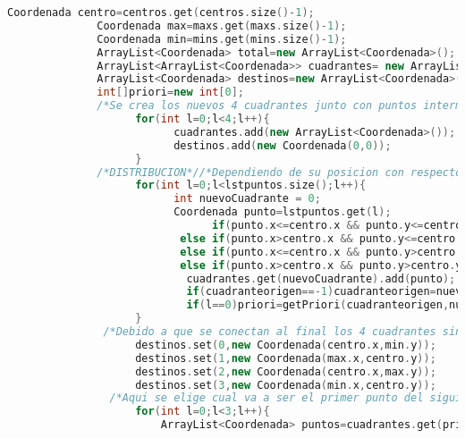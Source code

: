 \begin{lstlisting}[language=C++, caption=Algoritmo Base del Método de Cuadrantes, label=lst:codigo11,escapechar=|]
              Coordenada centro=centros.get(centros.size()-1);
              Coordenada max=maxs.get(maxs.size()-1);
              Coordenada min=mins.get(mins.size()-1);
              ArrayList<Coordenada> total=new ArrayList<Coordenada>(); //Resultado final
              ArrayList<ArrayList<Coordenada>> cuadrantes= new ArrayList<ArrayList<Coordenada>>();
              ArrayList<Coordenada> destinos=new ArrayList<Coordenada>(4);
              int[]priori=new int[0];
              /*Se crea los nuevos 4 cuadrantes junto con puntos intermedios para conectar cuadrante-cuadrante*/
                    for(int l=0;l<4;l++){
                          cuadrantes.add(new ArrayList<Coordenada>());
                          destinos.add(new Coordenada(0,0));
                    }
              /*DISTRIBUCION*//*Dependiendo de su posicion con respecto a los ejes del centro se iran a un determinado cuadrante*/
                    for(int l=0;l<lstpuntos.size();l++){
                          int nuevoCuadrante = 0;
                          Coordenada punto=lstpuntos.get(l);
                                if(punto.x<=centro.x && punto.y<=centro.y){nuevoCuadrante = 0;}
                           else if(punto.x>centro.x && punto.y<=centro.y){nuevoCuadrante = 1;}
                           else if(punto.x<=centro.x && punto.y>centro.y){nuevoCuadrante = 3;}
                           else if(punto.x>centro.x && punto.y>centro.y){nuevoCuadrante = 2;} 
                            cuadrantes.get(nuevoCuadrante).add(punto);
                            if(cuadranteorigen==-1)cuadranteorigen=nuevoCuadrante;
                            if(l==0)priori=getPriori(cuadranteorigen,nuevoCuadrante,cuadrantedestino);       
                    }   
               /*Debido a que se conectan al final los 4 cuadrantes sin relacionarse y el primer punto es el origen se crea unos puntos intermedios para verificar la cercania que hay en el eje X o Y dependiendo de la cuadrante*/           
                    destinos.set(0,new Coordenada(centro.x,min.y));
                    destinos.set(1,new Coordenada(max.x,centro.y));
                    destinos.set(2,new Coordenada(centro.x,max.y));       
                    destinos.set(3,new Coordenada(min.x,centro.y));   
                /*Aqui se elige cual va a ser el primer punto del siguiente cuadrante calculando la cercania que tiene con un punto elegido, de no tener puntos en las secciones vecinas se va al siguiente punto*/
                    for(int l=0;l<3;l++){
                        ArrayList<Coordenada> puntos=cuadrantes.get(priori[l]);

\end{lstlisting}
